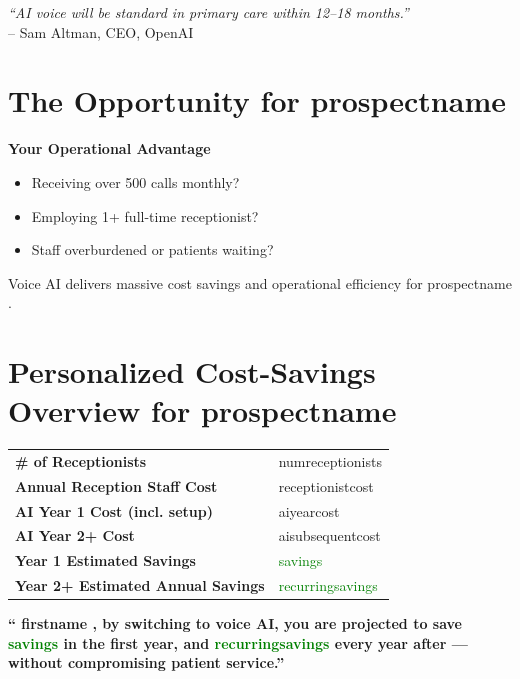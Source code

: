 \documentclass[12pt]{article}
\newcommand{\prospectname}{{ prospectname }}
\newcommand{\firstname}{{ firstname }}
\newcommand{\numreceptionists}{{ numreceptionists }}
\newcommand{\receptionistcost}{{ receptionistcost }}
\newcommand{\aiyearcost}{{ aiyearcost }}
\newcommand{\aisubsequentcost}{{ aisubsequentcost }}
\newcommand{\savings}{{ savings }}
\newcommand{\recurringsavings}{{ recurringsavings }}
\begin{document}
\vspace{1cm}
\begin{flushright}
    \textit{``AI voice will be standard in primary care within 12--18 months.''} \\
    -- Sam Altman, CEO, OpenAI
\end{flushright}

\vspace{1cm}

\section*{The Opportunity for\prospectname}
\textbf{Your Operational Advantage}
\begin{itemize}
    \item Receiving over 500 calls monthly?
    \item Employing 1+ full-time receptionist?
    \item Staff overburdened or patients waiting?
\end{itemize}

\newpage
Voice AI delivers massive cost savings and operational efficiency for\prospectname.

\vspace{0.5cm}

\section*{Personalized Cost-Savings Overview for\prospectname}
\begin{tabular}{ll}
    \toprule
    \textbf{\# of Receptionists} & \numreceptionists \\
    \textbf{Annual Reception Staff Cost} & \receptionistcost \\
    \textbf{AI Year 1 Cost (incl. setup)} & \aiyearcost \\
    \textbf{AI Year 2+ Cost} & \aisubsequentcost \\
    \textbf{Year 1 Estimated Savings} & \textcolor{green}{\savings} \\
    \textbf{Year 2+ Estimated Annual Savings} & \textcolor{green}{\recurringsavings} \\
    \bottomrule
\end{tabular}

\vspace{0.5cm}
\textbf{“\firstname, by switching to voice AI, you are projected to save \textcolor{green}{\savings} in the first year, and \textcolor{green}{\recurringsavings} every year after — without compromising patient service.”}
\end{document}

